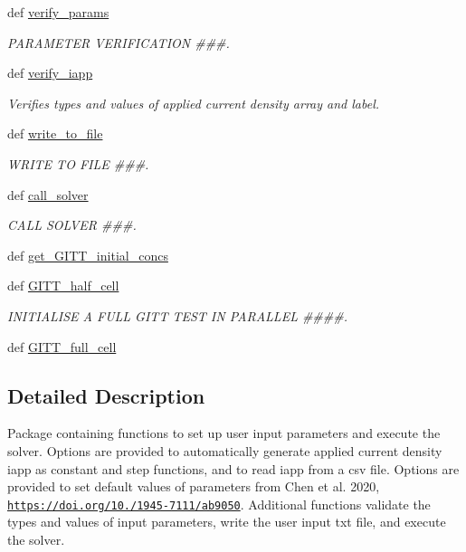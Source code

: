 \begin{DoxyCompactItemize}
def \hyperlink{namespaceuser__input__mod_a155b516c3ff05c1003e11caef128738f}{verify\-\_\-params}
\begin{DoxyCompactList}\small\item\em P\-A\-R\-A\-M\-E\-T\-E\-R V\-E\-R\-I\-F\-I\-C\-A\-T\-I\-O\-N \#\#\#. \end{DoxyCompactList}\item 
def \hyperlink{namespaceuser__input__mod_aa2382852ed7b2a4b8d19529c4ab0ac7e}{verify\-\_\-iapp}
\begin{DoxyCompactList}\small\item\em Verifies types and values of applied current density array and label. \end{DoxyCompactList}\item 
def \hyperlink{namespaceuser__input__mod_a23ddc1955874f5e5e2639522e3f4d276}{write\-\_\-to\-\_\-file}
\begin{DoxyCompactList}\small\item\em W\-R\-I\-T\-E T\-O F\-I\-L\-E \#\#\#. \end{DoxyCompactList}\item 
def \hyperlink{namespaceuser__input__mod_a839dc51641b24f79bf86be76eb2d6fbd}{call\-\_\-solver}
\begin{DoxyCompactList}\small\item\em C\-A\-L\-L S\-O\-L\-V\-E\-R \#\#\#. \end{DoxyCompactList}\item 
def \hyperlink{namespaceuser__input__mod_a4118861403235a2f22445738a0914fa5}{get\-\_\-\-G\-I\-T\-T\-\_\-initial\-\_\-concs}
\item 
def \hyperlink{namespaceuser__input__mod_acf625a02cf11d1ac11c4230e21f9987b}{G\-I\-T\-T\-\_\-half\-\_\-cell}
\begin{DoxyCompactList}\small\item\em I\-N\-I\-T\-I\-A\-L\-I\-S\-E A F\-U\-L\-L G\-I\-T\-T T\-E\-S\-T I\-N P\-A\-R\-A\-L\-L\-E\-L \#\#\#\#. \end{DoxyCompactList}\item 
def \hyperlink{namespaceuser__input__mod_a5e6e143a3b61689997f8b3036df0b5c6}{G\-I\-T\-T\-\_\-full\-\_\-cell}
\end{DoxyCompactItemize}


\subsection{Detailed Description}
Package containing functions to set up user input parameters and execute the solver. Options are provided to automatically generate applied current density iapp as constant and step functions, and to read iapp from a csv file. Options are provided to set default values of parameters from Chen et al. 2020, \href{https://doi.org/10.1149/1945-7111/ab9050}{\tt https\-://doi.\-org/10./1945-\/7111/ab9050}. Additional functions validate the types and values of input parameters, write the user input txt file, and execute the solver. 

